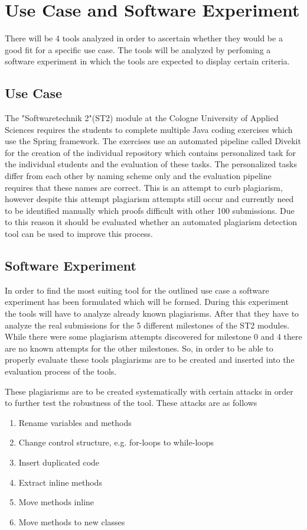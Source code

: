 \documentclass[a4paper, 11pt]{article}
\renewcommand{\\}{\vspace*{0.5\baselineskip} \newline}
\begin{document}
\section{Use Case and Software Experiment}

There will be 4 tools analyzed in order to ascertain whether they would be a good fit for a specific use case. The tools will be analyzed by perfoming
a software experiment in which the tools are expected to display certain criteria.

\subsection{Use Case}

The "Softwaretechnik 2"(ST2) module at the Cologne University of Applied Sciences requires the students to complete multiple Java coding exercises which
use the Spring framework. The exercises use an automated pipeline called Divekit for the creation of the individual repository which contains personalized task for the
individual students and the evaluation of these tasks. The personalized tasks differ from each other by naming scheme only and the evaluation pipeline
requires that these names are correct. This is an attempt to curb plagiarism, however despite this attempt plagiarism attempts still occur and currently
need to be identified manually which proofs difficult with other 100 submissions. Due to this reason it should be evaluated whether an automated plagiarism
detection tool can be used to improve this process.

\subsection{Software Experiment}

In order to find the most suiting tool for the outlined use case a software experiment has been formulated which will be formed. During this experiment
the tools will have to analyze already known plagiarisms. After that they have to analyze the real submissions for the 5 different milestones of the
ST2 modules. While there were some plagiarism attempts discovered for milestone 0 and 4 there are no known attempts for the other milestones. So, in order
to be able to properly evaluate these tools plagiarisms are to be created and inserted into the evaluation process of the tools.

These plagiarisms are to be created systematically with certain attacks in order to further test the robustness of the tool. These attacks are as follows
\begin{enumerate}
	\item Rename variables and methods
	\item Change control structure, e.g. for-loops to while-loops
	\item Insert duplicated code
	\item Extract inline methods
	\item Move methods inline
	\item Move methods to new classes
\end{enumerate}
\end{document}
